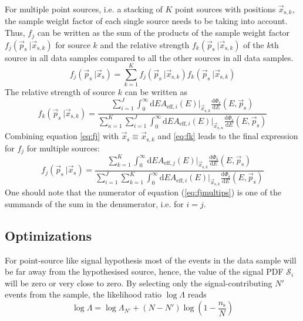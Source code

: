 \documentclass{article}
\newcommand{\eq}[1]{(\ref{#1})}
\newcommand{\ns}{n_{\mathrm{s}}}
\newcommand{\ps}{\vec{p}_{\mathrm{s}}}
\newcommand{\xs}{\vec{x}_{\mathrm{s}}}
\newcommand{\dPhisdE}{\frac{\mathrm{d}\Phi_{\mathrm{s}}}{\mathrm{d}E}}
\begin{document}
For multiple point sources, i.e. a stacking of $K$ point sources with positions
$\vec{x}_{\mathrm{s},k}$, the sample weight factor of each single source needs
to be taking into account. Thus, $f_{j}$ can be written as the sum of the
products of the sample weight factor $f_{j}(\ps~|\vec{x}_{\mathrm{s},k})$ for
source $k$ and the relative strength $f_{k}(\ps~|\vec{x}_{\mathrm{s},k})$ of the
$k$th source in all data samples compared to all the other sources in all data
samples.
\begin{equation}
 f_{j}(\ps~|\xs) = \sum_{k=1}^{K} f_{j}(\ps~|\vec{x}_{\mathrm{s},k}) f_{k}(\ps~|\vec{x}_{\mathrm{s},k})
\end{equation}
The relative strength of source $k$ can be written as
\begin{equation}
 f_{k}(\ps~|\vec{x}_{\mathrm{s},k}) =
    \frac{\sum_{i=1}^{J} \int_0^\infty \mathrm{d}E A_{\mathrm{eff},i}(E)|_{\vec{x}_{\mathrm{s},k}} \dPhisdE(E,\ps)}
         {\sum_{\kappa=1}^{K} \sum_{i=1}^{J} \int_0^\infty \mathrm{d}E A_{\mathrm{eff},i}(E)|_{\vec{x}_{\mathrm{s},\kappa}} \dPhisdE(E,\ps) }
 \label{eq:fk}
\end{equation}
Combining equation \ref{eq:fj} with $\xs \equiv \vec{x}_{\mathrm{s},k}$ and
\ref{eq:fk} leads to the final expression for $f_{j}$ for multiple sources:
\begin{equation}
 f_{j}(\ps~|\xs) = \frac{\sum_{k=1}^{K} \int_0^\infty \mathrm{d}E A_{\mathrm{eff},j}(E)|_{\vec{x}_{\mathrm{s},k}} \dPhisdE(E,\ps) }
                        {\sum_{i=1}^{J} \sum_{k=1}^{K} \int_0^\infty \mathrm{d}E A_{\mathrm{eff},i}(E)|_{\vec{x}_{\mathrm{s},k}} \dPhisdE(E,\ps) }
 \label{eq:fjmultips}
\end{equation}
One should note that the numerator of equation \eq{eq:fjmultips} is one of the
summands of the sum in the denumerator, i.e. for $i=j$.

\subsection{Optimizations}

For point-source like signal hypothesis most of the events in the data sample
will be far away from the hypothesised source, hence, the value of the
signal PDF $\mathcal{S}_i$ will be zero or very close to zero. By selecting only
the signal-contributing $N'$ events from the sample, the likelihood ratio
$\log \Lambda$ reads
\begin{equation}
 \log \Lambda = \log \Lambda_{N'} + (N - N')\log(1 - \frac{\ns}{N})
\end{equation}
\end{document}
